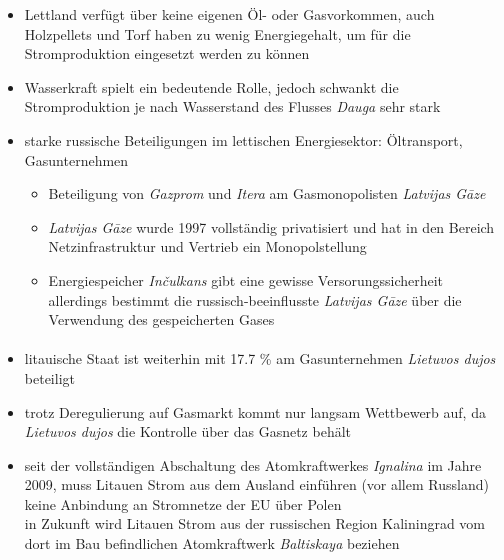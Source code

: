 \documentclass[11pt,a4paper]{article}
\begin{document}
\begin{itemize}

\item Lettland verfügt über keine eigenen Öl- oder Gasvorkommen, auch Holzpellets und Torf haben zu wenig Energiegehalt, um für die Stromproduktion eingesetzt werden zu können

\item Wasserkraft spielt ein bedeutende Rolle, jedoch schwankt die Stromproduktion je nach Wasserstand des Flusses \textsl{Dauga} sehr stark

\item starke russische Beteiligungen im lettischen Energiesektor: Öltransport, Gasunternehmen


	\begin{itemize}
	
	\item Beteiligung von \emph{Gazprom} und \emph{Itera} am Gasmonopolisten \emph{Latvijas G\={a}ze}
	
	\item \emph{Latvijas G\={a}ze} wurde 1997 vollständig privatisiert und hat in den Bereich Netzinfrastruktur und Vertrieb ein Monopolstellung
	
	\item Energiespeicher \textsl{In\v{c}ulkans} gibt eine gewisse Versorungssicherheit\\
	 allerdings bestimmt die russisch-beeinflusste \emph{Latvijas G\={a}ze} über die Verwendung des gespeicherten Gases
	
	\end{itemize}

\end{itemize}


\paragraph{}

\begin{itemize}

\item litauische Staat ist weiterhin mit 17.7 \% am Gasunternehmen \emph{Lietuvos dujos} beteiligt

\item trotz Deregulierung auf Gasmarkt kommt nur langsam Wettbewerb auf, da \emph{Lietuvos dujos} die Kontrolle über das Gasnetz behält

\item seit der vollständigen Abschaltung des Atomkraftwerkes \textsl{Ignalina} im Jahre 2009, muss Litauen Strom aus dem Ausland einführen (vor allem Russland)\\
 keine Anbindung an Stromnetze der EU über Polen\\
 in Zukunft wird Litauen Strom aus der russischen Region Kaliningrad vom dort im Bau befindlichen Atomkraftwerk \textsl{Baltiskaya} beziehen

\end{itemize}
\end{document}
